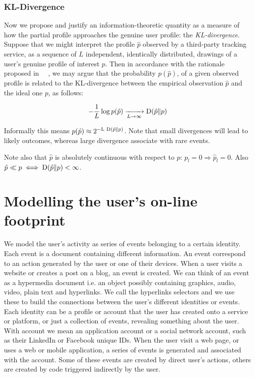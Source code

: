 \subsubsection{KL-Divergence}

Now we propose and justify an information-theoretic quantity as a measure of how the partial profile approaches the genuine user profile: the \emph{KL-divergence}. Suppose that we might interpret the profile $\hat{p}$ observed by a third-party tracking service, as a sequence of $L$ independent, identically distributed, drawings of a user's genuine profile of interest $p$. Then in accordance with the rationale proposed in ~\cite{parra2014measuring}~\cite{rebollo2011information}, we may argue that the probability $p(\hat{p})$, of a given observed profile is related to the KL-divergence between the empirical observation $\hat{p}$ and the ideal one $p$, as follows:

$$ - \frac {1}{L} \log{p(\hat{p})} \xrightarrow[L \to \infty]{} \textnormal{D}(\hat{p} \| p) $$

Informally this means $p(\hat{p}) \approx 2^{-\textnormal{L D}(\hat{p} \| p) } $. Note that small divergences will lead to likely outcomes, whereas large divergence associate with rare events.

Note also that $\hat{p}$ is absolutely continuous with respect to $p$: $p_l = 0 \Rightarrow \hat{p}_l = 0$. Also $\hat{p} \ll p \iff  \textnormal{D}(\hat{p} \| p) < \infty$.

\section{Modelling the user's on-line footprint}
We model the user's activity as series of events belonging to a certain identity. Each event is a document containing different information. An event correspond to an action generated by the user or one of their devices. When a user visits a website or creates a post on a blog, an event is created. We can think of an event as a hypermedia document i.e. an object possibly containing graphics, audio, video, plain text and hyperlinks. We call the hyperlinks selectors and we use these to build the connections between the user's different identities or events. Each identity can be a profile or account that the user has created onto a service or platform, or just a collection of events, revealing something about the user. With account we mean an application account or a social network account, such as their LinkedIn or Facebook unique IDs. When the user visit a web page, or uses a web or mobile application, a series of events is generated and associated with the account. Some of these events are created by direct user's actions, others are created by code triggered indirectly by the user.

